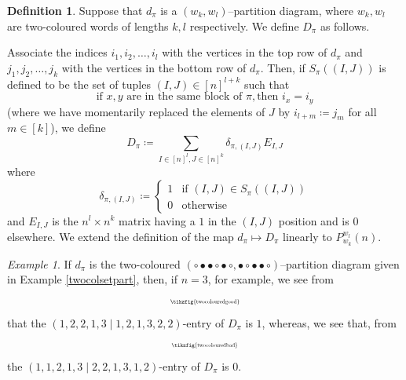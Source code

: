 \documentclass{article}
\theoremstyle{plain}
\theoremstyle{definition}
\newtheorem{definition}[theorem]{Definition}
\theoremstyle{remark}
\newtheorem{example}[theorem]{Example}
\begin{document}
\begin{definition} \label{partmatfunctor}
Suppose that $d_\pi$ is a $(w_k,w_l)$--partition diagram, where $w_k, w_l$ are two-coloured words of lengths $k, l$ respectively.
We define $D_\pi$ as follows.

Associate the indices $i_1, i_2, \dots, i_l$ with the vertices in the top row of $d_\pi$ and $j_1, j_2, \dots, j_k$ with the vertices in the bottom row of $d_\pi$.
	Then, if $S_\pi((I,J))$ is defined to be the set
	of tuples $(I,J) \in [n]^{l+k}$ such that
		\begin{equation} \label{Snindexingset}
			\text{if } x,y 
			\text{ are in the same block of } \pi, \text{then } i_x = i_y 
		\end{equation}
	(where we have momentarily replaced the elements of $J$ by $i_{l+m} \coloneqq j_m$ for all $m \in [k]$),
	 we define
	\begin{equation} \label{mappeddiagbasisSn}
		D_\pi
		\coloneqq
		\sum_{I \in [n]^l, J \in [n]^k}
		\delta_{\pi, (I,J)}
		E_{I,J}
	\end{equation}
	where
	\begin{equation}
		\delta_{\pi, (I,J)}
		\coloneqq
		\begin{cases}
			1 & \text{if } (I,J) \in S_\pi((I,J)) \\
			0 & \text{otherwise}
		\end{cases}
	\end{equation}
	and
	$E_{I,J}$ is the $n^l \times n^k$ matrix having a $1$ in the $(I,J)$ position and is $0$ elsewhere.
	We extend the definition of the map $d_\pi \mapsto D_\pi$ linearly to $P_{w_k}^{w_l}(n)$.
\end{definition}

\begin{example}
	If $d_\pi$ is the two-coloured 
$(\circ \bullet \bullet \circ \bullet \, \circ, \bullet \circ \bullet \bullet \circ)$--partition diagram given in Example \ref{twocolsetpart},
then, if $n = 3$, for example, we see from 
	\begin{equation}
		\begin{aligned}
			\scalebox{0.5}{\tikzfig{twocolouredgood}}
		\end{aligned}
	\end{equation}
that the $(1, 2, 2, 1, 3 \mid 1, 2, 1, 3, 2, 2)$-entry of $D_\pi$ is $1$,
whereas, we see that, from 
	\begin{equation}
		\begin{aligned}
			\scalebox{0.5}{\tikzfig{twocolouredbad}}
		\end{aligned}
	\end{equation}
	the $(1, 1, 2, 1, 3 \mid 2, 2, 1, 3, 1, 2)$-entry of $D_\pi$ is $0$.
\end{example}
\end{document}
